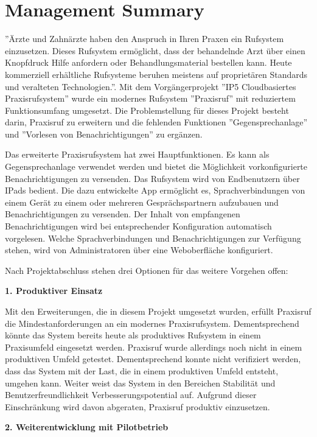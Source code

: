 \section*{Management Summary}

''Ärzte und Zahnärzte haben den Anspruch in Ihren Praxen ein Rufsystem einzusetzen.
Dieses Rufsystem ermöglicht, dass der behandelnde Arzt über einen Knopfdruck Hilfe anfordern oder Behandlungsmaterial bestellen kann.
Heute kommerziell erhältliche Rufsysteme beruhen meistens auf proprietären Standards und veralteten Technologien.''\cite{aufgabenstellung}.
Mit dem Vorgängerprojekt ''IP5 Cloudbasiertes Praxisrufsystem'' wurde ein modernes Rufsystem ''Praxisruf'' mit reduziertem Funktionsumfang umgesetzt.
Die Problemstellung für dieses Projekt besteht darin, Praxisruf zu erweitern und die fehlenden Funktionen ''Gegensprechanlage'' und ''Vorlesen von Benachrichtigungen'' zu ergänzen.

Das erweiterte Praxisrufsystem hat zwei Hauptfunktionen.
Es kann als Gegensprechanlage verwendet werden und bietet die Möglichkeit vorkonfigurierte Benachrichtigungen zu versenden.
Das Rufsystem wird von Endbenutzern über IPads bedient.
Die dazu entwickelte App ermöglicht es, Sprachverbindungen von einem Gerät zu einem oder mehreren Gesprächspartnern aufzubauen und Benachrichtigungen zu versenden.
Der Inhalt von empfangenen Benachrichtigungen wird bei entsprechender Konfiguration automatisch vorgelesen.
Welche Sprachverbindungen und Benachrichtigungen zur Verfügung stehen, wird von Administratoren über eine Weboberfläche konfiguriert.

Nach Projektabschluss stehen drei Optionen für das weitere Vorgehen offen:

\textbf{1. Produktiver Einsatz}

Mit den Erweiterungen, die in diesem Projekt umgesetzt wurden, erfüllt Praxisruf die Mindestanforderungen an ein modernes Praxisrufsystem.
Dementsprechend könnte das System bereits heute als produktives Rufsystem in einem Praxisumfeld eingesetzt werden.
Praxisruf wurde allerdings noch nicht in einem produktiven Umfeld getestet.
Dementsprechend konnte nicht verifiziert werden, dass das System mit der Last, die in einem produktiven Umfeld entsteht, umgehen kann.
Weiter weist das System in den Bereichen Stabilität und Benutzerfreundlichkeit Verbesserungspotential auf.
Aufgrund dieser Einschränkung wird davon abgeraten, Praxisruf produktiv einzusetzen.

\textbf{2. Weiterentwicklung mit Pilotbetrieb}

